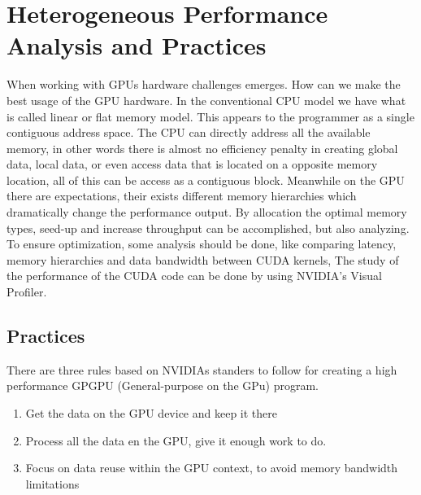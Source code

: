 
\chapter{Heterogeneous Performance Analysis and Practices} %

\label{Heterogeneous Performance Analysis and Practices} %



When working with GPUs hardware challenges emerges. How can we make the best usage of the GPU hardware. In the conventional CPU model we have what is called linear or flat memory model. This appears to the programmer as a single contiguous address space. The CPU can directly address all the available memory, in other words there is almost no efficiency penalty in creating global data, local data, or even access data that is located on a opposite memory location, all of this can be access as a contiguous block. \cite{cook} Meanwhile on the GPU there are expectations, their exists different memory hierarchies which dramatically change the performance output. By allocation the optimal memory types, seed-up and increase throughput can be accomplished, but also analyzing. To ensure optimization, some analysis should be done, like comparing latency, memory hierarchies and data bandwidth between CUDA kernels, The study of the performance of the CUDA code can be done by using NVIDIA's Visual Profiler.


\section{Practices}

There are three rules based on NVIDIAs standers to follow for creating a high performance GPGPU (General-purpose on the GPu) program.\cite{design}

\begin{enumerate}
  \item Get the data on the GPU device and keep it there
  \item Process all the data en the GPU, give it enough work to do.
  \item Focus on data reuse within the GPU context, to avoid memory bandwidth limitations
\end{enumerate}


